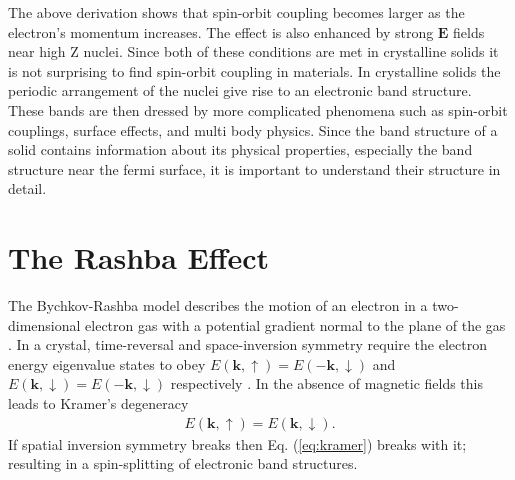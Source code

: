 \documentclass[12pt]{article}
\begin{document}
The above derivation shows that spin-orbit coupling becomes larger as the electron's momentum increases.
The effect is also enhanced by strong $\boldsymbol{E}$ fields near high Z nuclei.
Since both of these conditions are met in crystalline solids it is not surprising to find spin-orbit coupling in materials.
In crystalline solids the periodic arrangement of the nuclei give rise to an electronic band structure.
These bands are then dressed by more complicated phenomena such as spin-orbit couplings, surface effects, and multi body physics.
Since the band structure of a solid contains information about its physical properties, especially the band structure near the fermi surface, it is important to understand their structure in detail.

\section{The Rashba Effect}
The Bychkov-Rashba model describes the motion of an electron in a two-dimensional electron gas with a potential gradient normal to the plane of the gas \cite{Rashba}.
In a crystal, time-reversal and space-inversion symmetry require the electron energy eigenvalue states to obey $E(\boldsymbol{k},\uparrow)=E(-\boldsymbol{k},\downarrow)$ and $E(\boldsymbol{k},\downarrow)=E(-\boldsymbol{k},\downarrow)$ respectively \cite{Okuda-Kimura}.
In the absence of magnetic fields this leads to Kramer's degeneracy
\begin{align}
  \label{eq:kramer}
  E(\boldsymbol{k},\uparrow)=E(\boldsymbol{k},\downarrow)\text{.}
\end{align}
If spatial inversion symmetry breaks then Eq. (\ref{eq:kramer}) breaks with it; resulting in a spin-splitting of electronic band structures\cite{Winkler}.
\end{document}
